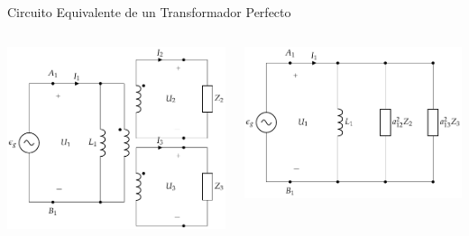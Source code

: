 \documentclass[aspectratio=169, usenames,svgnames,dvipsnames]{beamer}
\begin{document}
\begin{frame}[label={sec:org86bc725}]{Circuito Equivalente de un Transformador Perfecto}
\begin{columns}
\begin{column}{0.5\columnwidth}
\begin{center}
\includegraphics[width=\textwidth]{../figs/TrafoPerfectoIdealVariosDevanados_Impedancia.pdf}
\end{center}
\end{column}

\begin{column}{0.5\columnwidth}
\begin{center}
\includegraphics[width=\textwidth]{../figs/TrafoPerfectoVariosDevanados_Impedancia_Equivalente.pdf}
\end{center}
\end{column}
\end{columns}
\end{frame}
\end{document}
